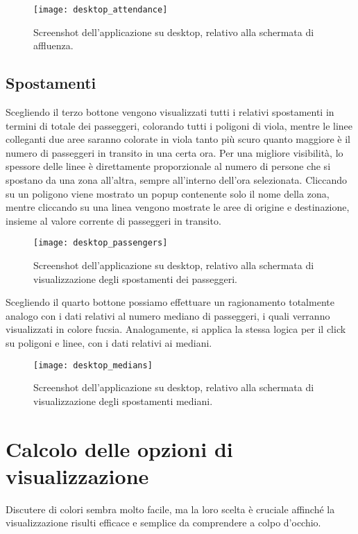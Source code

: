 \begin{figure}[H]
    \centering
    \texttt{[image: desktop\_attendance]}
    \caption[Screenshot dell'affluenza su desktop]{Screenshot dell'applicazione su desktop, relativo alla schermata di affluenza.}
    \label{fig:desktop_attendance}
\end{figure}

\subsection{Spostamenti}
Scegliendo il terzo bottone vengono visualizzati tutti i relativi spostamenti in termini di totale dei passeggeri, colorando tutti i poligoni di viola, mentre le linee colleganti due aree saranno colorate in viola tanto più scuro quanto maggiore è il numero di passeggeri in transito in una certa ora. Per una migliore visibilità, lo spessore delle linee è direttamente proporzionale al numero di persone che si spostano da una zona all'altra, sempre all'interno dell'ora selezionata. Cliccando su un poligono viene mostrato un popup contenente solo il nome della zona, mentre cliccando su una linea vengono mostrate le aree di origine e destinazione, insieme al valore corrente di passeggeri in transito.

\begin{figure}[H]
    \centering
    \texttt{[image: desktop\_passengers]}
    \caption[Screenshot degli spostamenti dei passeggeri su desktop]{Screenshot dell'applicazione su desktop, relativo alla schermata di visualizzazione degli spostamenti dei passeggeri.}
    \label{fig:desktop_passengers}
\end{figure}

Scegliendo il quarto bottone possiamo effettuare un ragionamento totalmente analogo con i dati relativi al numero mediano di passeggeri, i quali verranno visualizzati in colore fucsia. Analogamente, si applica la stessa logica per il click su poligoni e linee, con i dati relativi ai mediani.

\begin{figure}[H]
    \centering
    \texttt{[image: desktop\_medians]}
    \caption[Screenshot degli spostamenti mediani su desktop]{Screenshot dell'applicazione su desktop, relativo alla schermata di visualizzazione degli spostamenti mediani.}
    \label{fig:desktop_medians}
\end{figure}

\section{Calcolo delle opzioni di visualizzazione}
Discutere di colori sembra molto facile, ma la loro scelta è cruciale affinché la visualizzazione risulti efficace e semplice da comprendere a colpo d'occhio.


